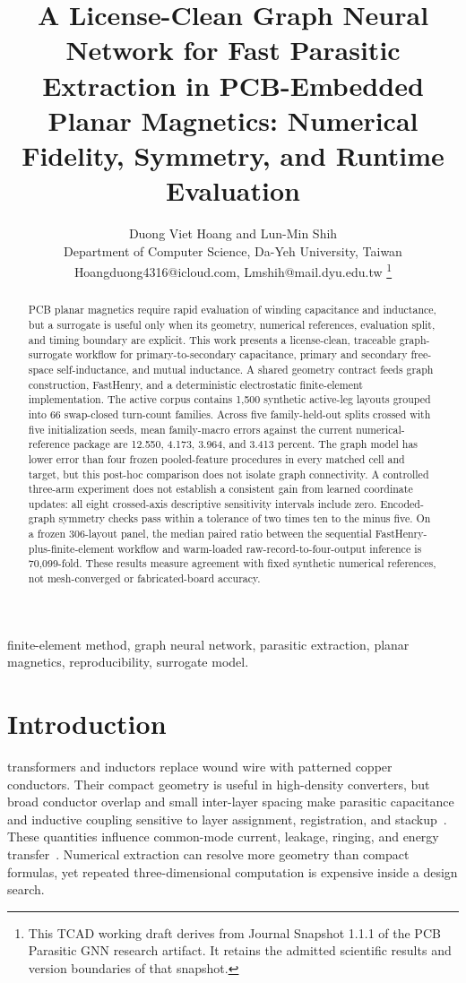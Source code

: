 \documentclass[journal]{IEEEtran}
\title{A License-Clean Graph Neural Network for Fast Parasitic Extraction in PCB-Embedded Planar Magnetics: Numerical Fidelity, Symmetry, and Runtime Evaluation}
\author{Duong Viet Hoang and Lun-Min Shih\\[-0.15ex]
\normalsize Department of Computer Science, Da-Yeh University, Taiwan\\[-0.15ex]
\normalsize Hoangduong4316@icloud.com, Lmshih@mail.dyu.edu.tw%
\thanks{This TCAD working draft derives from Journal Snapshot 1.1.1 of the PCB Parasitic GNN research artifact. It retains the admitted scientific results and version boundaries of that snapshot.}}
\begin{document}
\maketitle

\begin{abstract}
PCB planar magnetics require rapid evaluation of winding capacitance and inductance, but a surrogate is useful only when its geometry, numerical references, evaluation split, and timing boundary are explicit. This work presents a license-clean, traceable graph-surrogate workflow for primary-to-secondary capacitance, primary and secondary free-space self-inductance, and mutual inductance. A shared geometry contract feeds graph construction, FastHenry, and a deterministic electrostatic finite-element implementation. The active corpus contains 1,500 synthetic active-leg layouts grouped into 66 swap-closed turn-count families. Across five family-held-out splits crossed with five initialization seeds, mean family-macro errors against the current numerical-reference package are 12.550, 4.173, 3.964, and 3.413 percent. The graph model has lower error than four frozen pooled-feature procedures in every matched cell and target, but this post-hoc comparison does not isolate graph connectivity. A controlled three-arm experiment does not establish a consistent gain from learned coordinate updates: all eight crossed-axis descriptive sensitivity intervals include zero. Encoded-graph symmetry checks pass within a tolerance of two times ten to the minus five. On a frozen 306-layout panel, the median paired ratio between the sequential FastHenry-plus-finite-element workflow and warm-loaded raw-record-to-four-output inference is 70,099-fold. These results measure agreement with fixed synthetic numerical references, not mesh-converged or fabricated-board accuracy.
\end{abstract}

\begin{IEEEkeywords}
finite-element method, graph neural network, parasitic extraction, planar magnetics, reproducibility, surrogate model.
\end{IEEEkeywords}

\section{Introduction}
 transformers and inductors replace wound wire with patterned copper conductors. Their compact geometry is useful in high-density converters, but broad conductor overlap and small inter-layer spacing make parasitic capacitance and inductive coupling sensitive to layer assignment, registration, and stackup~\cite{ouyang,hurley,mclyman,erickson}. These quantities influence common-mode current, leakage, ringing, and energy transfer~\cite{ott,paul}. Numerical extraction can resolve more geometry than compact formulas, yet repeated three-dimensional computation is expensive inside a design search.
\end{document}
